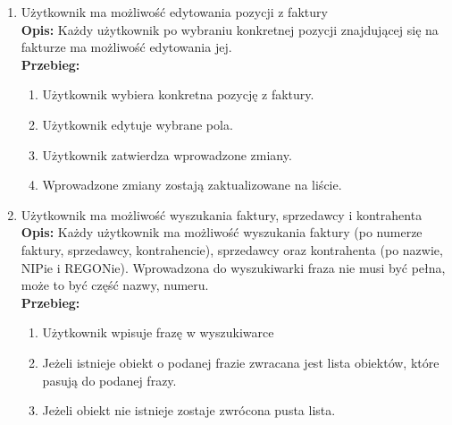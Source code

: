 \begin{enumerate}
    \item Użytkownik ma możliwość edytowania pozycji z faktury\\
    \textbf{Opis: } Każdy użytkownik po wybraniu konkretnej pozycji znajdującej się na fakturze ma możliwość edytowania jej.\\
    \textbf{Przebieg: }
    \begin{enumerate}
        \item Użytkownik wybiera konkretna pozycję z faktury.
        \item Użytkownik edytuje wybrane pola.
        \item Użytkownik zatwierdza wprowadzone zmiany.
        \item Wprowadzone zmiany zostają zaktualizowane na liście.\\
    \end{enumerate}
    
    \item Użytkownik ma możliwość wyszukania faktury, sprzedawcy i kontrahenta \\
    \textbf{Opis: } Każdy użytkownik ma możliwość wyszukania faktury (po numerze faktury, sprzedawcy, kontrahencie), sprzedawcy oraz kontrahenta (po nazwie, NIPie i REGONie). Wprowadzona do wyszukiwarki fraza nie musi być pełna, może to być część nazwy, numeru. \\
    \textbf{Przebieg: }
    \begin{enumerate}
        \item Użytkownik wpisuje frazę w wyszukiwarce
        \item Jeżeli istnieje obiekt o podanej frazie zwracana jest lista obiektów, które pasują do podanej frazy.
        \item Jeżeli obiekt nie istnieje zostaje zwrócona pusta lista.\\
    \end{enumerate}
    

\end{enumerate}

